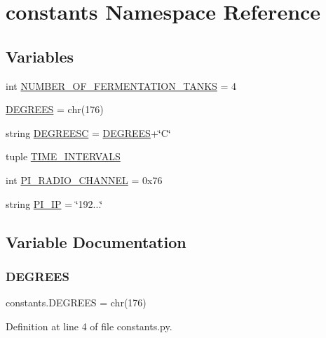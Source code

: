 \hypertarget{namespaceconstants}{}\section{constants Namespace Reference}
\label{namespaceconstants}
\subsection*{Variables}
\begin{DoxyCompactItemize}
\item 
int \mbox{\hyperlink{namespaceconstants_aab32be37ec39963e6c0896175590f415}{N\+U\+M\+B\+E\+R\+\_\+\+O\+F\+\_\+\+F\+E\+R\+M\+E\+N\+T\+A\+T\+I\+O\+N\+\_\+\+T\+A\+N\+KS}} = 4
\item 
\mbox{\hyperlink{namespaceconstants_ad0cd0814c34c9fffa31d67a60007c43f}{D\+E\+G\+R\+E\+ES}} = chr(176)
\item 
string \mbox{\hyperlink{namespaceconstants_aa853779dd0dec8d5eb25677731cee4fe}{D\+E\+G\+R\+E\+E\+SC}} = \mbox{\hyperlink{namespaceconstants_ad0cd0814c34c9fffa31d67a60007c43f}{D\+E\+G\+R\+E\+ES}}+\char`\"{}C\char`\"{}
\item 
tuple \mbox{\hyperlink{namespaceconstants_aa9593845aede93deb519829ee7b59536}{T\+I\+M\+E\+\_\+\+I\+N\+T\+E\+R\+V\+A\+LS}}
\item 
int \mbox{\hyperlink{namespaceconstants_ab436448fc76f96da894f5423e9134670}{P\+I\+\_\+\+R\+A\+D\+I\+O\+\_\+\+C\+H\+A\+N\+N\+EL}} = 0x76
\item 
string \mbox{\hyperlink{namespaceconstants_a0ab6561b402d2ae8cd806ae7e49caeba}{P\+I\+\_\+\+IP}} = \char`\"{}192...\char`\"{}
\end{DoxyCompactItemize}


\subsection{Variable Documentation}
\mbox{\label{namespaceconstants_ad0cd0814c34c9fffa31d67a60007c43f}} 
\subsubsection{\texorpdfstring{DEGREES}{DEGREES}}
{\footnotesize\ttfamily constants.\+D\+E\+G\+R\+E\+ES = chr(176)}



Definition at line 4 of file constants.\+py.

